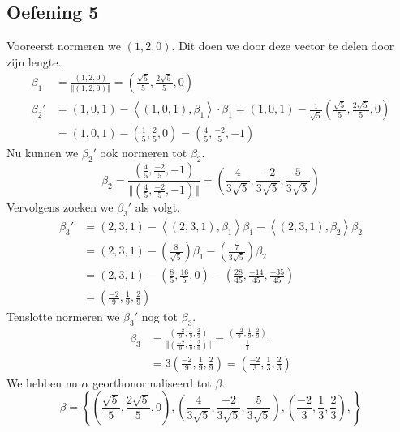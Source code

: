 \documentclass[lineaire_algebra_oplossingen.tex]{subfiles}
\begin{document}
\subsection{Oefening 5}
Vooreerst normeren we $(1,2,0)$. Dit doen we door deze vector te delen door zijn lengte.
\begin{align*}
\beta_1 &= \frac{(1,2,0)}{\Vert(1,2,0)\Vert}
= \left(\frac{\sqrt{5}}{5},\frac{2\sqrt{5}}{5},0\right) \\
\beta_2' &= (1,0,1) - \left\langle (1,0,1),\beta_1 \right\rangle \cdot \beta_1
= (1,0,1) - \frac{1}{\sqrt{5}}\left(\frac{\sqrt{5}}{5},\frac{2\sqrt{5}}{5},0\right) \\
&= (1,0,1) - (\frac{1}{{5}},\frac{2}{5},0) = (\frac{4}{5},\frac{-2}{5},-1)
\end{align*}
Nu kunnen we $\beta_2'$ ook normeren tot $\beta_2$.
\[
\beta_2 = \frac{(\frac{4}{5},\frac{-2}{5},-1)}{\Vert (\frac{4}{5},\frac{-2}{5},-1)\Vert}
= \left( \frac{4}{3\sqrt{5}},\frac{-2}{3\sqrt{5}},\frac{5}{3\sqrt{5}} \right)
\]
Vervolgens zoeken we $\beta_3'$ als volgt.
\begin{align*}
\beta_3'
&= (2,3,1)
- \left\langle (2,3,1),\beta_1\right\rangle\beta_1
- \left\langle (2,3,1),\beta_2\right\rangle\beta_2 \\
&= (2,3,1)
- \left(\frac{8}{\sqrt{5}}\right)  \beta_1
- \left(\frac{7}{3\sqrt{5}} \right)  \beta_2 \\
&=(2,3,1)
- \left(\frac{8}{5},\frac{16}{5},0\right)
- \left( \frac{28}{45},\frac{-14}{45},\frac{-35}{45} \right) \\
&= \left(\frac{-2}{9},\frac{1}{9},\frac{2}{9}\right)
\end{align*}
Tenslotte normeren we $\beta_3'$ nog tot $\beta_3$.
\begin{align*}
\beta_3
&= 
\frac{\left(\frac{-2}{9},\frac{1}{9},\frac{2}{9}\right)}
{\Vert\left(\frac{-2}{9},\frac{1}{9},\frac{2}{9}\right)\Vert}
=
\frac{\left(\frac{-2}{9},\frac{1}{9},\frac{2}{9}\right)}
{\frac{1}{3}} \\
&=
3
\left(\frac{-2}{9},\frac{1}{9},\frac{2}{9}\right)
=
\left(\frac{-2}{3},\frac{1}{3},\frac{2}{3}\right)
\end{align*}
We hebben nu $\alpha$ georthonormaliseerd tot $\beta$.
\[
\beta
=
\left\{
\left( \frac{\sqrt{5}}{5},\frac{2\sqrt{5}}{5},0 \right)
,
\left( \frac{4}{3\sqrt{5}},\frac{-2}{ 3\sqrt{5} },\frac{5}{ 3\sqrt{5} } \right)
,
\left( \frac{-2}{3},\frac{1}{3},\frac{2}{3} \right)
,
\right\}
\]
\end{document}
